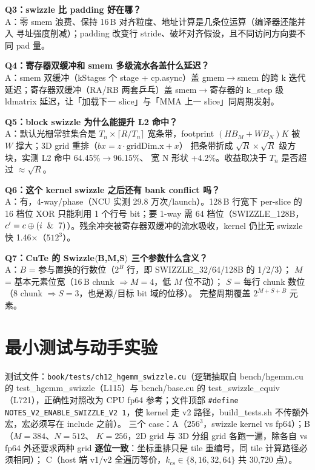 \textbf{Q3：swizzle 比 padding 好在哪？}\\
A：零 smem 浪费、保持 16\,B 对齐粒度、地址计算是几条位运算（编译器还能并入
寻址强度削减）；padding 改变行 stride、破坏对齐假设，且不同访问方向要不同
pad 量。

\textbf{Q4：寄存器双缓冲和 smem 多级流水各盖什么延迟？}\\
A：smem 双缓冲（kStages 个 stage + cp.async）盖 gmem$\to$smem 的跨 k 迭代
延迟；寄存器双缓冲（RA/RB 两套乒乓）盖 smem$\to$寄存器的 k\_step 级
ldmatrix 延迟，让「加载下一 slice」与「MMA 上一 slice」同周期发射。

\textbf{Q5：block swizzle 为什么能提升 L2 命中？}\\
A：默认光栅常驻集合是 $T_n\times\lceil R/T_n\rceil$ 宽条带，footprint
$(H B_M+W B_N)K$ 被 $W$ 撑大；3D grid 重排（$bx=z\cdot\mathrm{gridDim.x}+x$）
把条带折成 $\sqrt{R}\times\sqrt{R}$ 级方块，实测 L2 命中 64.45\%$\to$96.15\%、
宽 N 形状 +4.2\%。收益取决于 $T_n$ 是否超过 $\approx\sqrt{R}$。

\textbf{Q6：这个 kernel swizzle 之后还有 bank conflict 吗？}\\
A：有，4-way/phase（NCU 实测 29.8 万次/launch）。128\,B 行宽下 per-slice 的
16 档位 XOR 只能利用 1 个行号 bit；要 1-way 需 64 档位（SWIZZLE\_128B，
$c'=c\oplus(i\And7)$）。残余冲突被寄存器双缓冲的流水吸收，kernel 仍比无
swizzle 快 1.46$\times$（$512^3$）。

\textbf{Q7：CuTe 的 Swizzle$\langle$B,M,S$\rangle$ 三个参数什么含义？}\\
A：$B$ = 参与置换的行数位（$2^B$ 行，即 SWIZZLE\_32/64/128B 的 1/2/3）；
$M$ = 基本元素位宽（16\,B chunk $\Rightarrow M{=}4$，低 $M$ 位不动）；
$S$ = 每行 chunk 数位（8 chunk $\Rightarrow S{=}3$，也是源/目标 bit 域的位移）。
完整周期覆盖 $2^{M+S+B}$ 元素。

\section{最小测试与动手实验}

测试文件：\texttt{book/\allowbreak{}tests/\allowbreak{}ch12\_\allowbreak{}hgemm\_\allowbreak{}swizzle.cu}（逻辑抽取自 bench/hgemm.cu
的 test\_hgemm\_swizzle（L115）与 bench/base.cu 的 test\_swizzle\_equiv（L721），正确性对照改为
CPU fp64 参考；文件顶部 \texttt{\#define NOTES\_\allowbreak{}V2\_\allowbreak{}ENABLE\_\allowbreak{}SWIZZLE\_\allowbreak{}V2 1}，使
kernel 走 v2 路径，build\_tests.sh 不传额外宏，宏必须写在 include 之前）。
三个 case：A（$256^3$，swizzle kernel vs fp64）；B（$M{=}384$、$N{=}512$、
$K{=}256$，2D grid 与 3D 分组 grid 各跑一遍，除各自 vs fp64 外还要求两种 grid
\textbf{逐位一致}：坐标重排只是 tile 重编号，同 tile 计算路径必须相同）；
C（host 端 v1/v2 全遍历等价，$k_{\mathrm{cs}}\in\{8,16,32,64\}$ 共 30{,}720 点）。


